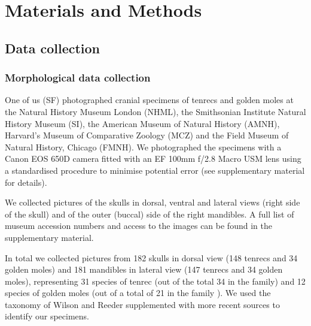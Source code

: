 \documentclass[12pt,a4paper]{article}
\begin{document}
\section{Materials and Methods}

\subsection{Data collection} %

\subsubsection{Morphological data collection} %

	
One of us (SF) photographed cranial specimens of tenrecs and golden moles at the Natural History Museum London (NHML), the Smithsonian Institute Natural History Museum (SI), the American Museum of Natural History (AMNH), Harvard's Museum of Comparative Zoology (MCZ) and the Field Museum of Natural History, Chicago (FMNH). We photographed the specimens with a Canon EOS 650D camera fitted with an EF 100mm f/2.8 Macro USM lens using a standardised procedure to minimise potential error (see supplementary material for details). 



We collected pictures of the skulls in dorsal, ventral and lateral views (right side of the skull) and of the outer (buccal) side of the right mandibles. A full list of museum accession numbers and access to the images can be found in the supplementary material.


In total we collected pictures from 182 skulls in dorsal view (148 tenrecs and 34 golden moles) and 181 mandibles in lateral view (147 tenrecs and 34 golden moles), representing 31 species of tenrec (out of the total 34 in the family) and 12 species of golden moles (out of a total of 21 in the family \citep{Asher2010}). We used the taxonomy of Wilson and Reeder \citeyearpar{Wilson2005} supplemented with more recent sources \citep{IUCN2012, Olson2013} to identify our specimens. 
	
\end{document}
